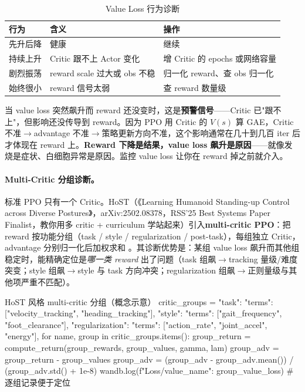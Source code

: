 \begin{table}[H]
\centering
\caption{Value Loss 行为诊断}
\label{tab:rlmc-diag-vloss}
\begin{tabular}{p{3.2cm}p{4.6cm}p{4.4cm}}
\hline
行为 & 含义 & 操作 \\
\hline
先升后降 & 健康 & 继续 \\
持续上升 & Critic 跟不上 Actor 变化 & 增 Critic 的 epochs 或网络容量 \\
剧烈振荡 & reward scale 过大或 obs 不稳 & 归一化 reward、查 obs 归一化 \\
始终很小 & reward 信号太弱 & 查 reward 数量级 \\
\hline
\end{tabular}
\end{table}

\begin{insight}\label{ins:rlmc-diag-vloss-lead}
当 value loss 突然飙升而 reward 还没变时，这是\textbf{预警信号}——Critic 已"跟不上"，但影响还没传导到 reward。因为 PPO 用 Critic 的 $V(s)$ 算 GAE，Critic 不准$\to$advantage 不准$\to$策略更新方向不准，这个影响通常在几十到几百 iter 后才体现在 reward 上。\textbf{Reward 下降是结果，value loss 飙升是原因}——就像发烧是症状、白细胞异常是原因。监控 value loss 让你在 reward 掉之前就介入。
\end{insight}

\paragraph{Multi-Critic 分组诊断。}标准 PPO 只有一个 Critic。HoST（《Learning Humanoid Standing-up Control across Diverse Postures》，arXiv:2502.08378，RSS'25 Best Systems Paper Finalist，教你用多 critic + curriculum 学站起来）引入\textbf{multi-critic PPO}：把 reward 按功能分组（task / style / regularization / post-task），每组独立 Critic，advantage 分别归一化后加权求和 \cite{huang2025host}。其诊断优势是：某组 value loss 飙升而其他组稳定时，能精确定位是\emph{哪一类 reward} 出了问题（task 组飙$\to$tracking 量级/难度突变；style 组飙$\to$style 与 task 方向冲突；regularization 组飙$\to$正则量级与其他项严重不匹配）。

\begin{codebox}[Python]{HoST 风格 multi-critic 分组（概念示意）}
critic_groups = {
    "task":           {"terms": ["velocity_tracking", "heading_tracking"]},
    "style":          {"terms": ["gait_frequency", "foot_clearance"]},
    "regularization": {"terms": ["action_rate", "joint_accel", "energy"]},
}
for name, group in critic_groups.items():
    group_return = compute_return(group_rewards, group_values, gamma, lam)
    group_adv = group_return - group_values
    group_adv = (group_adv - group_adv.mean()) / (group_adv.std() + 1e-8)
    wandb.log({f"Loss/value_{name}": group_value_loss})  # 逐组记录便于定位
\end{codebox}

